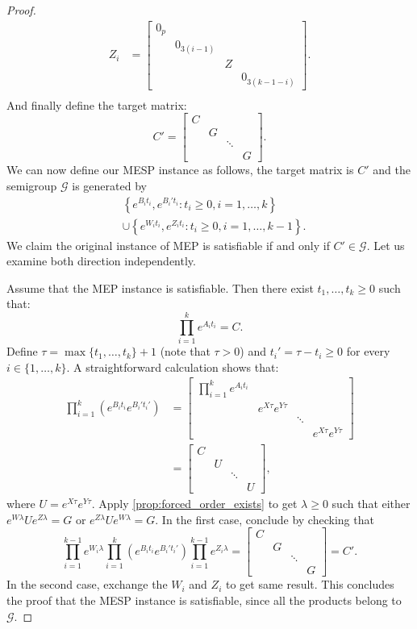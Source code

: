 \begin{proof}
\begin{align*}
Z_{i}&=\begin{bmatrix}0_p&&&\\&0_{3(i-1)}&&\\&&Z&\\&&&0_{3(k-1-i)}\end{bmatrix}.\\
\end{align*}
And finally define the target matrix:
\[C'=\begin{bmatrix}C&&&\\&G&&\\&&\ddots&\\&&&G\end{bmatrix}.\]
We can now define our MESP instance as follows, the target matrix is $C'$ and the semigroup $\mathcal{G}$
is generated by
\begin{align*}
&\left\lbrace e^{B_{i}t_{i}},e^{B_{i}'t_{i}}:t_{i}\geqslant0,i=1,\ldots,k\right\rbrace \\
&\cup\left\lbrace e^{W_{i}t_{i}},e^{Z_{i}t_{i}}:t_{i}\geqslant0,i=1,\ldots,k-1\right\rbrace.
\end{align*}
We claim the original instance of MEP is satisfiable if and only if $C'\in\mathcal{G}$.
Let us examine both direction independently.

Assume that the MEP instance is satisfiable. Then there exist $t_1,\ldots,t_k\geqslant0$ such that:
\[\prod_{i=1}^{k}e^{A_{i}t_{i}}=C.\]
Define $\tau=\max\lbrace t_1,\ldots,t_k\rbrace+1$ (note that $\tau>0$) and $t_{i}'=\tau-t_{i}\geqslant0$ for every $i\in\lbrace 1,\ldots,k\rbrace$.
A straightforward calculation shows that:
\begin{align*}
\prod_{i=1}^{k}\left(e^{B_{i}t_{i}}e^{B_{i}'t_{i}'}\right)
    &=\begin{bmatrix}\prod_{i=1}^{k}e^{A_{i}t_{i}}&&&\\&e^{X\tau}e^{Y\tau}&&\\&&\ddots&\\&&&e^{X\tau}e^{Y\tau}\end{bmatrix}\\
    &=\begin{bmatrix}C&&&\\&U&&\\&&\ddots&\\&&&U\end{bmatrix},
\end{align*}
where $U=e^{X\tau}e^{Y\tau}$. Apply \cref{prop:forced_order_exists} to get $\lambda\geqslant0$
such that either $e^{W\lambda}Ue^{Z\lambda}=G$ or $e^{Z\lambda}Ue^{W\lambda}=G$. In the first case, conclude by
checking that
\[
\prod_{i=1}^{k-1}e^{W_{i}\lambda}\prod_{i=1}^{k}\left(e^{B_{i}t_{i}}e^{B_{i}'t_{i}'}\right)\prod_{i=1}^{k-1}e^{Z_{i}\lambda}
    =\begin{bmatrix}C&&&\\&G&&\\&&\ddots&\\&&&G\end{bmatrix}=C'.
\]
In the second case, exchange the $W_{i}$ and $Z_{i}$ to get same result. This concludes the proof that
the MESP instance is satisfiable, since all the products belong to $\mathcal{G}$.


\end{proof}
